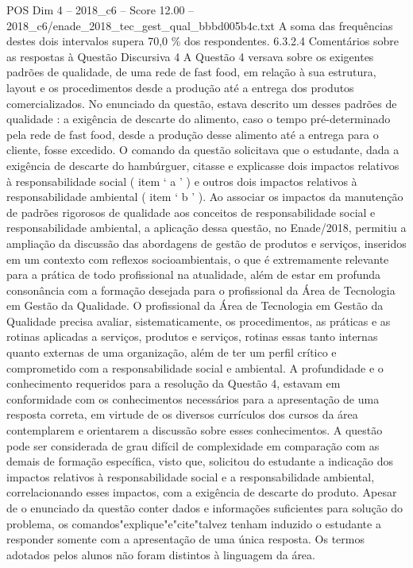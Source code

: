 \begin{textsample}{POS Dim 4 – 2018\_c6 – Score 12.00 – 2018\_c6/enade\_2018\_tec\_gest\_qual\_bbbd005b4c.txt}
A soma das frequências destes dois intervalos supera 70,0 \% dos respondentes. 6.3.2.4 Comentários sobre as respostas à Questão Discursiva 4 A Questão 4 versava sobre os exigentes padrões de qualidade, de uma rede de fast food, em relação à sua estrutura, layout e os procedimentos desde a produção até a entrega dos produtos comercializados.
No enunciado da questão, estava descrito um desses padrões de qualidade : a exigência de descarte do alimento, caso o tempo pré-determinado pela rede de fast food, desde a produção desse alimento até a entrega para o cliente, fosse excedido.
O comando da questão solicitava que o estudante, dada a exigência de descarte do hambúrguer, citasse e explicasse dois impactos relativos à responsabilidade social ( item ‘ a ’ ) e outros dois impactos relativos à responsabilidade ambiental ( item ‘ b ’ ).
Ao associar os impactos da manutenção de padrões rigorosos de qualidade aos conceitos de responsabilidade social e responsabilidade ambiental, a aplicação dessa questão, no Enade/2018, permitiu a ampliação da discussão das abordagens de gestão de produtos e serviços, inseridos em um contexto com reflexos socioambientais, o que é extremamente relevante para a prática de todo profissional na atualidade, além de estar em profunda consonância com a formação desejada para o profissional da Área de Tecnologia em Gestão da Qualidade.
O profissional da Área de Tecnologia em Gestão da Qualidade precisa avaliar, sistematicamente, os procedimentos, as práticas e as rotinas aplicadas a serviços, produtos e serviços, rotinas essas tanto internas quanto externas de uma organização, além de ter um perfil crítico e comprometido com a responsabilidade social e ambiental.
A profundidade e o conhecimento requeridos para a resolução da Questão 4, estavam em conformidade com os conhecimentos necessários para a apresentação de uma resposta correta, em virtude de os diversos currículos dos cursos da área contemplarem e orientarem a discussão sobre esses conhecimentos.
A questão pode ser considerada de grau difícil de complexidade em comparação com as demais de formação específica, visto que, solicitou do estudante a indicação dos impactos relativos à responsabilidade social e a responsabilidade ambiental, correlacionando esses impactos, com a exigência de descarte do produto.
Apesar de o enunciado da questão conter dados e informações suficientes para solução do problema, os comandos"explique"e"cite"talvez tenham induzido o estudante a responder somente com a apresentação de uma única resposta.
Os termos adotados pelos alunos não foram distintos à linguagem da área.

\end{textsample}
